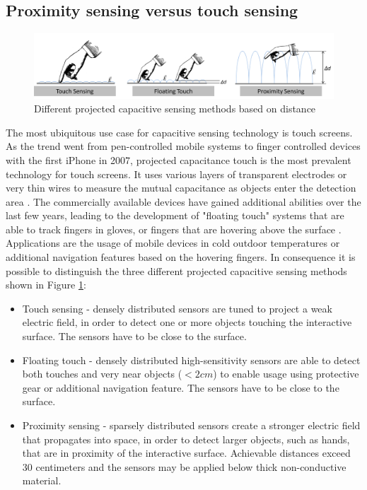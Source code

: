 \subsection{Proximity sensing versus touch sensing}
\begin{figure}[h]
\centering
\includegraphics[width=1.0\textwidth]{images/cap_projected_sensing_methods.png}
\caption{Different projected capacitive sensing methods based on distance}
\label{fig:cap_proj_sensing_methods}
\end{figure} 
The most ubiquitous use case for capacitive sensing technology is touch screens. As the trend went from pen-controlled mobile systems to finger controlled devices with the first iPhone in 2007, projected capacitance touch is the most prevalent technology for touch screens. It uses various layers of transparent electrodes or very thin wires to measure the mutual capacitance as objects enter the detection area \cite{Barrett2010}. The commercially available devices have gained additional abilities over the last few years, leading to the development of "floating touch" systems that are able to track fingers in gloves, or fingers that are hovering above the surface \cite{Cypress2012, Nokia2012}. Applications are the usage of mobile devices in cold outdoor temperatures or additional navigation features based on the hovering fingers. In consequence it is possible to distinguish the three different projected capacitive sensing methods shown in Figure \ref{fig:cap_proj_sensing_methods}:
\begin{itemize}
\item Touch sensing - densely distributed sensors are tuned to project a weak electric field, in order to detect one or more objects touching the interactive surface. The sensors have to be close to the surface.
\item Floating touch - densely distributed high-sensitivity sensors are able to detect both touches and very near objects (\(<2cm\)) to enable usage using protective gear or additional navigation feature. The sensors have to be close to the surface.
\item Proximity sensing - sparsely distributed sensors create a stronger electric field that propagates into space, in order to detect larger objects, such as hands, that are in proximity of the interactive surface. Achievable distances exceed 30 centimeters and the sensors may be applied below thick non-conductive material.
\end{itemize}
